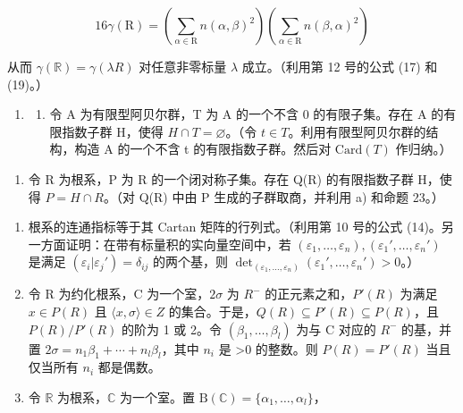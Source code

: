 \[
16 \gamma (\mathrm{R}) = (\sum_ {\alpha \in \mathrm{R}} n (\alpha , \beta) ^ {2}) (\sum_ {\alpha \in \mathrm{R}} n (\beta , \alpha) ^ {2})
\]

从而 \(\gamma (\mathbb{R}) = \gamma (\lambda R)\) 对任意非零标量 \(\lambda\) 成立。（利用第 12 号的公式 (17) 和 (19)。）

\begin{enumerate}
\def\labelenumi{\arabic{enumi})}
\setcounter{enumi}{5}
\tightlist
\item
  \begin{enumerate}
  \def\labelenumii{\alph{enumii})}
  \tightlist
  \item
    令 A 为有限型阿贝尔群，T 为 A 的一个不含 0 的有限子集。存在 A 的有限指数子群 H，使得 \(H \cap T = \varnothing\)。（令 \(t \in T\)。利用有限型阿贝尔群的结构，构造 A 的一个不含 t 的有限指数子群。然后对 \(\text{Card}(T)\) 作归纳。）
  \end{enumerate}
\end{enumerate}

\begin{enumerate}
\def\labelenumi{\alph{enumi})}
\setcounter{enumi}{1}
\tightlist
\item
  令 R 为根系，P 为 R 的一个闭对称子集。存在 Q(R) 的有限指数子群 H，使得 \(P = H \cap R\)。（对 Q(R) 中由 P 生成的子群取商，并利用 a) 和命题 23。）
\end{enumerate}

\begin{enumerate}
\def\labelenumi{\arabic{enumi})}
\setcounter{enumi}{6}
\item
  根系的连通指标等于其 Cartan 矩阵的行列式。（利用第 10 号的公式 (14)。另一方面证明：在带有标量积的实向量空间中，若 \((\varepsilon_1, \ldots, \varepsilon_n), (\varepsilon_1', \ldots, \varepsilon_n')\) 是满足 \((\varepsilon_i | \varepsilon_j') = \delta_{ij}\) 的两个基，则 \(\det_{(\varepsilon_1, \ldots, \varepsilon_n)} (\varepsilon_1', \ldots, \varepsilon_n') > 0\)。）
\item
  令 R 为约化根系，C 为一个室，\(2\sigma\) 为 \(R^{-}\) 的正元素之和，\(P'(R)\) 为满足 \(x \in P(R)\) 且 \(\langle x, \sigma \rangle \in Z\) 的集合。于是，\(Q(R) \subseteq P'(R) \subseteq P(R)\)，且 \(P(R)/P'(R)\) 的阶为 1 或 2。令 \((\beta_{1}, \ldots, \beta_{l})\) 为与 C 对应的 \(R^{-}\) 的基，并置 \(2\sigma = n_{1}\beta_{1} + \cdots + n_{l}\beta_{l}\)，其中 \(n_{i}\) 是 \textgreater0 的整数。则 \(P(R) = P'(R)\) 当且仅当所有 \(n_{i}\) 都是偶数。
\item
  令 \(\mathbb{R}\) 为根系，\(\mathbb{C}\) 为一个室。置 \(\mathrm{B}(\mathbb{C}) = \{\alpha_1, \ldots, \alpha_l\}\)，
\end{enumerate}

